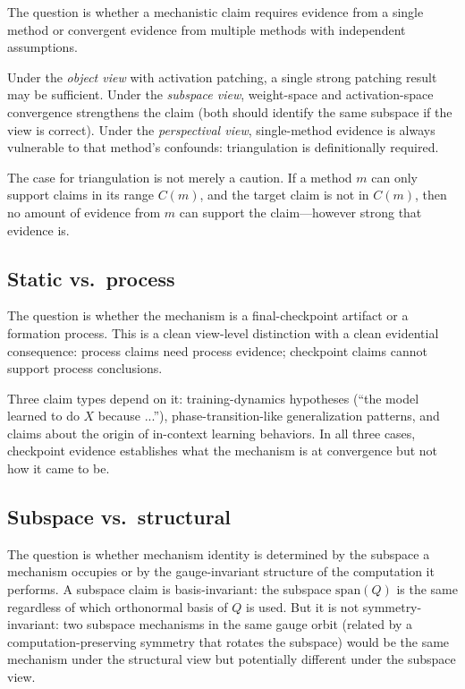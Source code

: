 \documentclass{article}
\begin{document}
The question is whether a mechanistic claim requires evidence from a
single method or convergent evidence from multiple methods with
independent assumptions.

Under the \emph{object view} with activation patching, a single strong
patching result may be sufficient.  Under the \emph{subspace view},
weight-space and activation-space convergence strengthens the claim
(both should identify the same subspace if the view is correct).
Under the \emph{perspectival view}, single-method evidence is always
vulnerable to that method's confounds: triangulation is definitionally
required.

The case for triangulation is not merely a caution.  If a method $m$
can only support claims in its range $C(m)$, and the target claim is
not in $C(m)$, then no amount of evidence from $m$ can support the
claim---however strong that evidence is.

\subsection{Static vs.\ process}

The question is whether the mechanism is a final-checkpoint artifact
or a formation process.  This is a clean view-level distinction with
a clean evidential consequence: process claims need process evidence;
checkpoint claims cannot support process conclusions.

Three claim types depend on it: training-dynamics hypotheses (``the model
learned to do $X$ because ...''), phase-transition-like generalization
patterns, and claims about the origin of in-context learning behaviors.  In all three cases, checkpoint evidence establishes what
the mechanism is at convergence but not how it came to be.

\subsection{Subspace vs.\ structural}

The question is whether mechanism identity is determined by the subspace
a mechanism occupies or by the gauge-invariant structure of the
computation it performs.  A subspace claim is basis-invariant: the
subspace $\mathrm{span}(Q)$ is the same regardless of which orthonormal
basis of $Q$ is used.  But it is not symmetry-invariant: two subspace
mechanisms in the same gauge orbit (related by a computation-preserving
symmetry that rotates the subspace) would be the same mechanism under
the structural view but potentially different under the subspace view.
\end{document}

